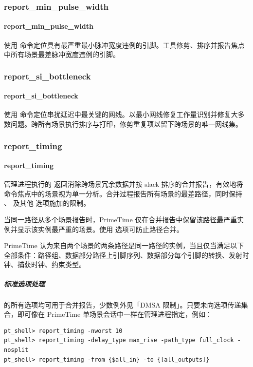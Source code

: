 \subsubsection{report\_min\_pulse\_width}
\paragraph*{report\_min\_pulse\_width}

使用  命令定位具有最严重最小脉冲宽度违例的引脚。工具修剪、排序并报告焦点中所有场景最差脉冲宽度违例的引脚。

\subsubsection{report\_si\_bottleneck}
\paragraph*{report\_si\_bottleneck}

使用  命令定位串扰延迟中最关键的网线。以最小网线修复工作量识别并修复大多数问题。跨所有场景执行排序与打印，修剪重复项以留下跨场景的唯一网线集。

\subsubsection{report\_timing}
\paragraph*{report\_timing}

管理进程执行的  返回消除跨场景冗余数据并按 slack 排序的合并报告，有效地将命令焦点中的场景视为单一分析。合并过程报告所有场景的最差路径，同时保持 、 及其他  选项施加的限制。

当同一路径从多个场景报告时，PrimeTime 仅在合并报告中保留该路径最严重实例并显示该实例最严重的场景。使用  选项可防止路径合并。

PrimeTime 认为来自两个场景的两条路径是同一路径的实例，当且仅当满足以下全部条件：路径组、数据部分路径上引脚序列、数据部分每个引脚的转换、发射时钟、捕获时钟、约束类型。

\subparagraph{标准选项处理}
 的所有选项均可用于合并报告，少数例外见「DMSA 限制」。只要未向选项传递集合，即可像在 PrimeTime 单场景会话中一样在管理进程指定，例如：
\begin{lstlisting}
pt_shell> report_timing -nworst 10
pt_shell> report_timing -delay_type max_rise -path_type full_clock -nosplit
pt_shell> report_timing -from {$all_in} -to {[all_outputs]}
\end{lstlisting}

